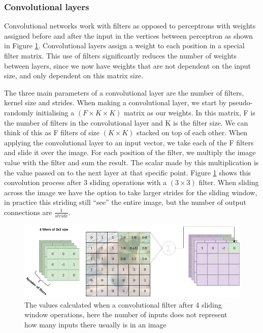 \subsubsection{Convolutional layers}

Convolutional networks work with filters as opposed to perceptrons with weights assigned before and after the input in the vertices between perceptron as shown in Figure \ref{fig:conv_opp}. Convolutional layers assign a weight to each position in a special filter matrix. This use of filters significantly reduces the number of weights between layers, since we now have weights that are not dependent on the input size, and only dependent on this matrix size.

The three main parameters of a convolutional layer are the number of filters, kernel size and strides.
When making a convolutional layer, we start by pseudo-randomly initialising a $ (F \times K \times K)$ matrix as our weights.
In this matrix, F is the number of filters in the convolutional layer and K is the filter size. We can think of this as F filters of size $(K \times K)$ stacked on top of each other. 
When applying the convolutional layer to an input vector, we take each of the F filters and slide it over the image. 
For each position of the filter, we multiply the image value with the filter and sum the result. The scalar made by this multiplication is the value passed on to the next layer at that specific point.
Figure \ref{fig:conv_opp} shows this convolution process after 3 sliding operations with a $(3 \times 3)$ filter. When sliding across the image we have the option to take larger strides for the sliding window, in practice this striding still ``see'' the entire image, but the number of output connections are $\frac{1}{stride}$.
 
\begin{figure}[h]
        \centering
        \includegraphics[scale=0.5]{background/figures/Conv_filter.png}
        \caption{The values calculated when a convolutional filter after 4 sliding window operations, here the number of inputs does not represent how many inputs there usually is in an image}
        \label{fig:conv_opp}
\end{figure}


